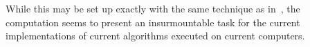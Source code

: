 While this may be set up exactly with the same technique as in~\cite{Brouwer09e}, the computation seems to present an insurmountable task for the current implementations of current algorithms executed on current computers.

 



